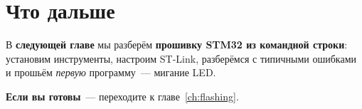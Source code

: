 \section{Что дальше}
\label{sec:intro-next}

В \textbf{следующей главе} мы разберём \textbf{прошивку STM32
из командной строки}: установим инструменты, настроим ST-Link,
разберёмся с типичными ошибками и прошьём \emph{первую}
программу~--- мигание LED.

\textbf{Если вы готовы}~--- переходите к главе~\ref{ch:flashing}.